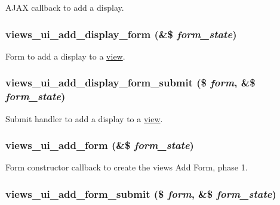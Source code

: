 AJAX callback to add a display. \hypertarget{admin_8inc_7e4eac2a6fd8837f1d0d3c7fdd514d61}{
\subsubsection[{views\_\-ui\_\-add\_\-display\_\-form}]{\setlength{\rightskip}{0pt plus 5cm}views\_\-ui\_\-add\_\-display\_\-form (\&\$ {\em form\_\-state})}}
\label{admin_8inc_7e4eac2a6fd8837f1d0d3c7fdd514d61}


Form to add a display to a \hyperlink{classview}{view}. \hypertarget{admin_8inc_15c3d469bfc61174dcf7846b6b2e5ea8}{
\subsubsection[{views\_\-ui\_\-add\_\-display\_\-form\_\-submit}]{\setlength{\rightskip}{0pt plus 5cm}views\_\-ui\_\-add\_\-display\_\-form\_\-submit (\$ {\em form}, \/  \&\$ {\em form\_\-state})}}
\label{admin_8inc_15c3d469bfc61174dcf7846b6b2e5ea8}


Submit handler to add a display to a \hyperlink{classview}{view}. \hypertarget{admin_8inc_f710eec12e4548afda4d0c4345de257e}{
\subsubsection[{views\_\-ui\_\-add\_\-form}]{\setlength{\rightskip}{0pt plus 5cm}views\_\-ui\_\-add\_\-form (\&\$ {\em form\_\-state})}}
\label{admin_8inc_f710eec12e4548afda4d0c4345de257e}


Form constructor callback to create the views Add Form, phase 1. \hypertarget{admin_8inc_10536694129577330ac66c50461331c3}{
\subsubsection[{views\_\-ui\_\-add\_\-form\_\-submit}]{\setlength{\rightskip}{0pt plus 5cm}views\_\-ui\_\-add\_\-form\_\-submit (\$ {\em form}, \/  \&\$ {\em form\_\-state})}}
\label{admin_8inc_10536694129577330ac66c50461331c3}


